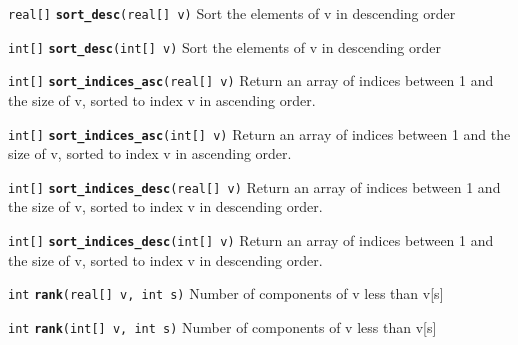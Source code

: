 \documentclass[
  10pt,
]{book}
\begin{document}

\texttt{real{[}{]}} \textbf{\texttt{sort\_desc}}\texttt{(real{[}{]}\ v)}\newline
Sort the elements of v in descending order


\texttt{int{[}{]}} \textbf{\texttt{sort\_desc}}\texttt{(int{[}{]}\ v)}\newline
Sort the elements of v in descending order


\texttt{int{[}{]}} \textbf{\texttt{sort\_indices\_asc}}\texttt{(real{[}{]}\ v)}\newline
Return an array of indices between 1 and the size of v, sorted to
index v in ascending order.


\texttt{int{[}{]}} \textbf{\texttt{sort\_indices\_asc}}\texttt{(int{[}{]}\ v)}\newline
Return an array of indices between 1 and the size of v, sorted to
index v in ascending order.


\texttt{int{[}{]}} \textbf{\texttt{sort\_indices\_desc}}\texttt{(real{[}{]}\ v)}\newline
Return an array of indices between 1 and the size of v, sorted to
index v in descending order.


\texttt{int{[}{]}} \textbf{\texttt{sort\_indices\_desc}}\texttt{(int{[}{]}\ v)}\newline
Return an array of indices between 1 and the size of v, sorted to
index v in descending order.


\texttt{int} \textbf{\texttt{rank}}\texttt{(real{[}{]}\ v,\ int\ s)}\newline
Number of components of v less than v{[}s{]}


\texttt{int} \textbf{\texttt{rank}}\texttt{(int{[}{]}\ v,\ int\ s)}\newline
Number of components of v less than v{[}s{]}
\end{document}
